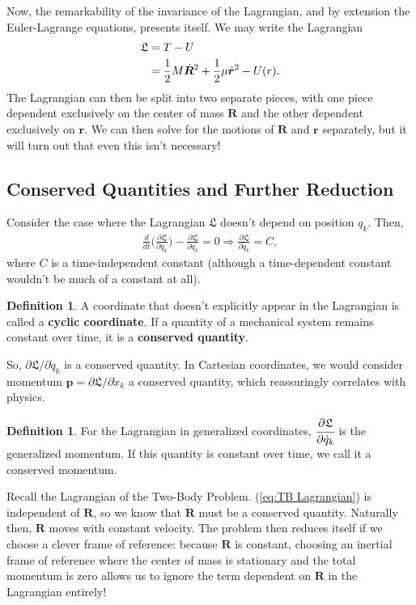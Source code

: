 \documentclass[10pt, psamsfonts]{amsart}
\theoremstyle{definition}
\newtheorem{defn}[thm]{Definition}
\theoremstyle{remark}
\numberwithin{equation}{section}
\begin{document}
Now, the remarkability of the invariance of the Lagrangian, and by extension the Euler-Lagrange equations, presents itself. We may write the Lagrangian
\begin{align}
  \label{eq:TB Lagrangian}
  \mathfrak{L} &= T - U \notag \\
               &= \frac{1}{2} M \dot{\bm{R}}^2 + \frac{1}{2} \mu\dot{\bm{r}}^2 - U(r). 
\end{align}
The Lagrangian can then be split into two separate pieces, with one piece dependent exclusively on the center of mass $\bm{R}$ and the other dependent exclusively on $\bm{r}$. We can then solve for the motions of $\bm{R}$ and $\bm{r}$ separately, but it will turn out that even this isn't necessary!

\subsection{Conserved Quantities and Further Reduction}
Consider the case where the Lagrangian $\mathfrak{L}$ doesn't depend on position ${q_k}$. Then,
\begin{align*}
  \frac{d}{dt} \bigg(\frac{\partial \mathfrak{L}}{\partial \dot{q}_k}  \bigg) - \frac{\partial \mathfrak{L}}{\partial q_k} = 0 \Rightarrow \frac{\partial \mathfrak{L}}{\partial \dot{q}_k} = C,  
\end{align*}
where $C$ is a time-independent constant (although a time-dependent constant wouldn't be much of a constant at all).
\begin{defn}
  A coordinate that doesn't explicitly appear in the Lagrangian is called a \textbf{cyclic coordinate}. If a quantity of a mechanical system remains constant over time, it is a \textbf{conserved quantity}.
\end{defn}

\noindent So, ${\partial \mathfrak{L}}/{\partial \dot{q}_k}$ is a conserved quantity. In Cartesian coordinates, we would consider momentum $\bm{p} = {\partial \mathfrak{L}}/{\partial \dot{x}_k}$ a conserved quantity, which reassuringly correlates with physics. 

\begin{defn}
For the Lagrangian in generalized coordinates,
  $\cfrac{\partial \mathfrak{L}}{\partial \dot{q}_k}$
is the generalized momentum. If this quantity is constant over time, we call it a conserved momentum.
\end{defn}

Recall the Lagrangian of the Two-Body Problem. (\ref{eq:TB Lagrangian}) is independent of $\bm{R}$, so we know that $\dot{\bm{R}}$ must be a conserved quantity. Naturally then, $\bm{R}$ moves with constant velocity. The problem then reduces itself if we choose a clever frame of reference: because $\bm{R}$ is constant, choosing an inertial frame of reference where the center of mass is stationary and the total momentum is zero allows us to ignore the term dependent on $\bm{R}$ in the Lagrangian entirely!
\end{document}
